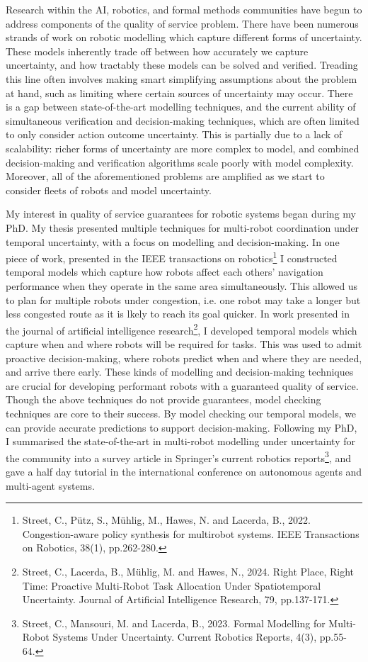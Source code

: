 \documentclass[11pt]{article}
\begin{document}
Research within the AI, robotics, and formal methods communities have begun to address components of the quality of service problem.
%
There have been numerous strands of work on robotic modelling which capture different forms of uncertainty.
%
These models inherently trade off between how accurately we capture uncertainty, and how tractably these models can be solved and verified.
%
Treading this line often involves making smart simplifying assumptions about the problem at hand, such as limiting where certain sources of uncertainty may occur.
%
There is a gap between state-of-the-art modelling techniques, and the current ability of simultaneous verification and decision-making techniques, which are often limited to only consider action outcome uncertainty.
%
This is partially due to a lack of scalability: richer forms of uncertainty are more complex to model, and combined decision-making and verification algorithms scale poorly with model complexity.
%
Moreover, all of the aforementioned problems are amplified as we start to consider fleets of robots and  model uncertainty.

My interest in quality of service guarantees for robotic systems began during my PhD.
%
My thesis presented multiple techniques for multi-robot coordination under temporal uncertainty, with a focus on modelling and decision-making.
%
In one piece of work, presented in the IEEE transactions on robotics\footnote{Street, C., Pütz, S., Mühlig, M., Hawes, N. and Lacerda, B., 2022. Congestion-aware policy synthesis for multirobot systems. IEEE Transactions on Robotics, 38(1), pp.262-280.} I constructed temporal models which capture how robots affect each others' navigation performance when they operate in the same area simultaneously.
%
This allowed us to plan for multiple robots under congestion, i.e. one robot may take a longer but less congested route as it is lkely to reach its goal quicker.
%
In work presented in the journal of artificial intelligence research\footnote{Street, C., Lacerda, B., Mühlig, M. and Hawes, N., 2024. Right Place, Right Time: Proactive Multi-Robot Task Allocation Under Spatiotemporal Uncertainty. Journal of Artificial Intelligence Research, 79, pp.137-171.}, I developed temporal models which capture when and where robots will be required for tasks.
%
This was used to admit proactive decision-making, where robots predict when and where they are needed, and arrive there early.
%
These kinds of modelling and decision-making techniques are crucial for developing performant robots with a guaranteed quality of service.
%
Though the above techniques do not provide guarantees, model checking techniques are core to their success.
%
By model checking our temporal models, we can provide accurate predictions to support decision-making.
%
Following my PhD, I summarised the state-of-the-art in multi-robot modelling under uncertainty for the community into a survey article in Springer's current robotics reports\footnote{Street, C., Mansouri, M. and Lacerda, B., 2023. Formal Modelling for Multi-Robot Systems Under Uncertainty. Current Robotics Reports, 4(3), pp.55-64.}, and gave a half day tutorial in the international conference on autonomous agents and multi-agent systems.
\end{document}
